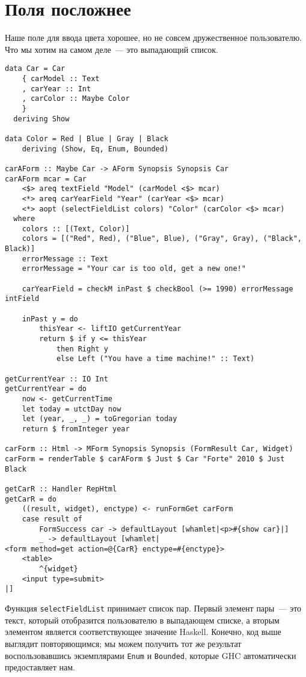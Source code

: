\section{Поля посложнее}
Наше поле для ввода цвета хорошее, но не совсем дружественное пользователю.
Что мы хотим на самом деле~--- это выпадающий список.

\begin{lstlisting}[caption={Выпадающие списки}]
data Car = Car
    { carModel :: Text
    , carYear :: Int
    , carColor :: Maybe Color
    }
  deriving Show

data Color = Red | Blue | Gray | Black
    deriving (Show, Eq, Enum, Bounded)

carAForm :: Maybe Car -> AForm Synopsis Synopsis Car
carAForm mcar = Car
    <$> areq textField "Model" (carModel <$> mcar)
    <*> areq carYearField "Year" (carYear <$> mcar)
    <*> aopt (selectFieldList colors) "Color" (carColor <$> mcar)
  where
    colors :: [(Text, Color)]
    colors = [("Red", Red), ("Blue", Blue), ("Gray", Gray), ("Black", Black)]
    errorMessage :: Text
    errorMessage = "Your car is too old, get a new one!"

    carYearField = checkM inPast $ checkBool (>= 1990) errorMessage intField

    inPast y = do
        thisYear <- liftIO getCurrentYear
        return $ if y <= thisYear
            then Right y
            else Left ("You have a time machine!" :: Text)

getCurrentYear :: IO Int
getCurrentYear = do
    now <- getCurrentTime
    let today = utctDay now
    let (year, _, _) = toGregorian today
    return $ fromInteger year

carForm :: Html -> MForm Synopsis Synopsis (FormResult Car, Widget)
carForm = renderTable $ carAForm $ Just $ Car "Forte" 2010 $ Just Black

getCarR :: Handler RepHtml
getCarR = do
    ((result, widget), enctype) <- runFormGet carForm
    case result of
        FormSuccess car -> defaultLayout [whamlet|<p>#{show car}|]
        _ -> defaultLayout [whamlet|
<form method=get action=@{CarR} enctype=#{enctype}>
    <table>
        ^{widget}
    <input type=submit>
|]
\end{lstlisting}

Функция \lstinline'selectFieldList' принимает список пар. Первый элемент
пары~--- это текст, который отобразится пользователю в выпадающем списке, а
вторым элементом является соответствующее значение Haskell. Конечно, код выше
выглядит повторяющимся; мы можем получить тот же результат воспользовавшись
экземплярами \lstinline'Enum' и \lstinline'Bounded', которые GHC автоматически
предоставляет нам.

